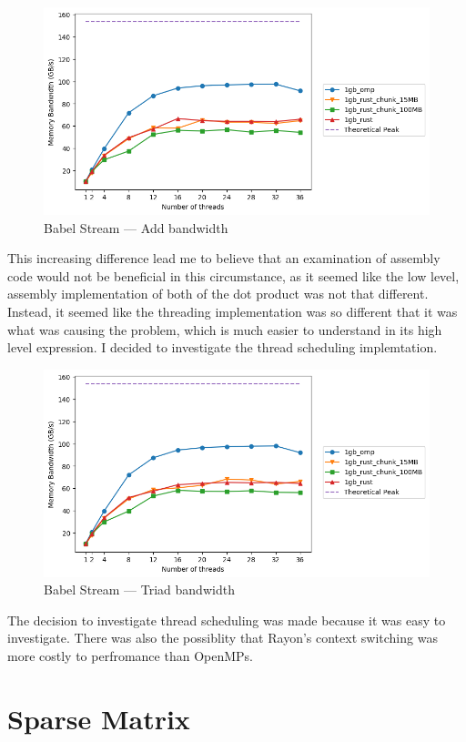 \begin{figure}[h]
\centering
\includegraphics[width=.9\linewidth]{figs/babel/Add.png}
\caption{Babel Stream --- Add bandwidth}\label{fig:babel-add}
\end{figure}

This increasing difference lead me to believe that an examination of assembly code would not be beneficial in this circumstance, as it seemed like the low level, assembly implementation of both of the dot product was not that different. Instead, it seemed like the threading implementation was so different that it was what was causing the problem, which is much easier to understand in its high level expression. I decided to investigate the thread scheduling implemtation.

\begin{figure}[h]
\centering
\includegraphics[width=.9\linewidth]{figs/babel/Triad.png}
\caption{Babel Stream --- Triad bandwidth}\label{fig:babel-triad}
\end{figure}

The decision to investigate thread scheduling was made because it was easy to investigate. There was also the possiblity that Rayon's context switching was more costly to perfromance than OpenMPs.
\section{Sparse Matrix}\label{sec:res-sparse}
